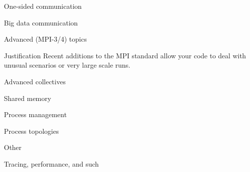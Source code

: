 \documentclass[10pt]{beamer}
\begin{document}
{} {One-sided communication}
\label{sec:1side}
 


{} {Big data communication}
\label{sec:bigdata}


{} {Advanced (MPI-3/4) topics}

\begin{frame}{Justification}
  Recent additions to the MPI standard allow your 
  code to deal with unusual scenarios or very large scale runs.
\end{frame}

{} {Advanced collectives}
\label{sec:coll2}


{} {Shared memory}
\label{sec:shared}


{} {Process management}
\label{sec:process}


{} {Process topologies}
\label{sec:topo}


{} {Other}

{} {Tracing, performance, and such}
\label{sec:trace}

\end{document}
